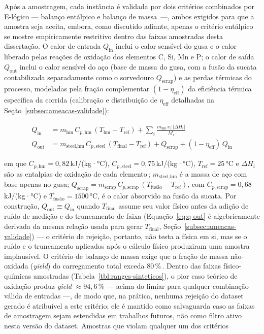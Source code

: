 Após a amostragem, cada instância é validada por dois critérios combinados por E-lógico — balanço entálpico e balanço de massa\,\cite{xia2024dmpinn,chattopadhyay2022hybrid} —, ambos exigidos para que a amostra seja aceita, embora, como discutido adiante, apenas o critério entálpico se mostre empiricamente restritivo dentro das faixas amostradas desta dissertação. O calor de entrada $Q_\text{in}$ inclui o calor sensível do gusa e o calor liberado pelas reações de oxidação dos elementos C, Si, Mn e P; o calor de saída $Q_\text{out}$ inclui o calor sensível do aço (base de massa do gusa, com a fusão da sucata contabilizada separadamente como o sorvedouro $Q_\text{scrap}$) e as perdas térmicas do processo, modeladas pela fração complementar $(1-\eta_\text{eff})$ da eficiência térmica específica da corrida (calibração e distribuição de $\eta_\text{eff}$ detalhadas na Seção~\ref{subsec:ameacas-validade}):

\begin{align}
Q_\text{in}  &= m_\text{hm}\,C_{p,\text{hm}}\,(T_\text{hm} - T_\text{ref}) + \sum_i \frac{m_\text{hm}\,x_i\,|\Delta H_i|}{M_i} \label{eq:q-in} \\
Q_\text{out} &= m_{\text{steel},\text{hm}}\,C_{p,\text{steel}}\,(T_\text{final} - T_\text{ref}) + Q_\text{scrap} + (1-\eta_\text{eff})\,Q_\text{in} \label{eq:q-out}
\end{align}

\noindent em que $C_{p,\text{hm}} = 0{,}82$\,kJ/(kg·°C), $C_{p,\text{steel}} = 0{,}75$\,kJ/(kg·°C), $T_\text{ref} = 25$\,°C e $\Delta H_i$ são as entalpias de oxidação de cada elemento\,\cite{chattopadhyay2022hybrid,madhavan2020heatbalance}; $m_{\text{steel},\text{hm}}$ é a massa de aço com base apenas no gusa; $Q_\text{scrap} = m_\text{scrap}\,C_{p,\text{scrap}}\,(T_\text{fusão} - T_\text{ref})$, com $C_{p,\text{scrap}} = 0{,}68$\,kJ/(kg·°C) e $T_\text{fusão} = 1500$\,°C, é o calor absorvido na fusão da sucata. Por construção, $Q_\text{out} \equiv Q_\text{in}$ quando $T_\text{final}$ assume seu valor físico antes da adição de ruído de medição e do truncamento de faixa (Equação~\ref{eq:q-out} é algebricamente derivada da mesma relação usada para gerar $T_\text{final}$, Seção~\ref{subsec:ameacas-validade}) — o critério de rejeição, portanto, não testa a física em si, mas se o ruído e o truncamento aplicados após o cálculo físico produziram uma amostra implausível. O critério de balanço de massa exige que a fração de massa não-oxidada (\textit{yield}) do carregamento total exceda 80\,\%\,\cite{chattopadhyay2022hybrid}. Dentro das faixas físico-químicas amostradas (Tabela~\ref{tbl:ranges-sinteticos}), o pior caso teórico de oxidação produz \textit{yield} $\approx 94{,}6\,\%$ — acima do limiar para qualquer combinação válida de entradas —, de modo que, na prática, nenhuma rejeição do dataset gerado é atribuível a este critério; ele é mantido como salvaguarda caso as faixas de amostragem sejam estendidas em trabalhos futuros, não como filtro ativo nesta versão do dataset. Amostras que violam qualquer um dos critérios

